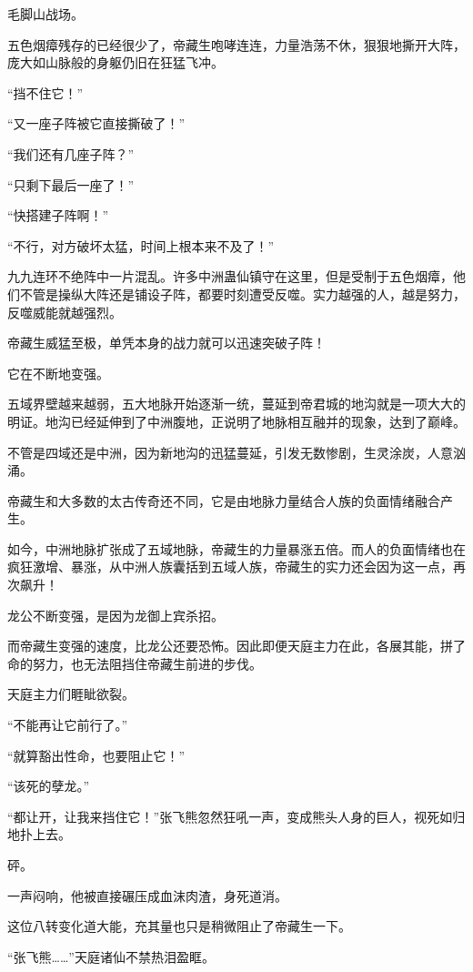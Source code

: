 
\begin{this_body}

毛脚山战场。

五色烟瘴残存的已经很少了，帝藏生咆哮连连，力量浩荡不休，狠狠地撕开大阵，庞大如山脉般的身躯仍旧在狂猛飞冲。

“挡不住它！”

“又一座子阵被它直接撕破了！”

“我们还有几座子阵？”

“只剩下最后一座了！”

“快搭建子阵啊！”

“不行，对方破坏太猛，时间上根本来不及了！”

九九连环不绝阵中一片混乱。许多中洲蛊仙镇守在这里，但是受制于五色烟瘴，他们不管是操纵大阵还是铺设子阵，都要时刻遭受反噬。实力越强的人，越是努力，反噬威能就越强烈。

帝藏生威猛至极，单凭本身的战力就可以迅速突破子阵！

它在不断地变强。

五域界壁越来越弱，五大地脉开始逐渐一统，蔓延到帝君城的地沟就是一项大大的明证。地沟已经延伸到了中洲腹地，正说明了地脉相互融并的现象，达到了巅峰。

不管是四域还是中洲，因为新地沟的迅猛蔓延，引发无数惨剧，生灵涂炭，人意汹涌。

帝藏生和大多数的太古传奇还不同，它是由地脉力量结合人族的负面情绪融合产生。

如今，中洲地脉扩张成了五域地脉，帝藏生的力量暴涨五倍。而人的负面情绪也在疯狂激增、暴涨，从中洲人族囊括到五域人族，帝藏生的实力还会因为这一点，再次飙升！

龙公不断变强，是因为龙御上宾杀招。

而帝藏生变强的速度，比龙公还要恐怖。因此即便天庭主力在此，各展其能，拼了命的努力，也无法阻挡住帝藏生前进的步伐。

天庭主力们睚眦欲裂。

“不能再让它前行了。”

“就算豁出性命，也要阻止它！”

“该死的孽龙。”

“都让开，让我来挡住它！”张飞熊忽然狂吼一声，变成熊头人身的巨人，视死如归地扑上去。

砰。

一声闷响，他被直接碾压成血沫肉渣，身死道消。

这位八转变化道大能，充其量也只是稍微阻止了帝藏生一下。

“张飞熊……”天庭诸仙不禁热泪盈眶。


\end{this_body}
